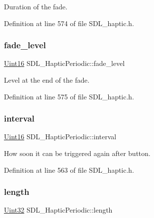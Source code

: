 Duration of the fade. 

Definition at line 574 of file S\+D\+L\+\_\+haptic.\+h.

\mbox{\label{struct_s_d_l___haptic_periodic_afa7713fc264959873f2a852fca4174fd}} 
\subsubsection{\texorpdfstring{fade\_level}{fade\_level}}
{\footnotesize\ttfamily \mbox{\hyperlink{_s_d_l__stdinc_8h_a31fcc0a076c9068668173ee26d33e42b}{Uint16}} S\+D\+L\+\_\+\+Haptic\+Periodic\+::fade\+\_\+level}

Level at the end of the fade. 

Definition at line 575 of file S\+D\+L\+\_\+haptic.\+h.

\mbox{\label{struct_s_d_l___haptic_periodic_a076d266e917098d89b2385b631629162}} 
\subsubsection{\texorpdfstring{interval}{interval}}
{\footnotesize\ttfamily \mbox{\hyperlink{_s_d_l__stdinc_8h_a31fcc0a076c9068668173ee26d33e42b}{Uint16}} S\+D\+L\+\_\+\+Haptic\+Periodic\+::interval}

How soon it can be triggered again after button. 

Definition at line 563 of file S\+D\+L\+\_\+haptic.\+h.

\mbox{\label{struct_s_d_l___haptic_periodic_a0ef0b17c54aaa5c99886c2a618444026}} 
\subsubsection{\texorpdfstring{length}{length}}
{\footnotesize\ttfamily \mbox{\hyperlink{_s_d_l__stdinc_8h_add440eff171ea5f55cb00c4a9ab8672d}{Uint32}} S\+D\+L\+\_\+\+Haptic\+Periodic\+::length}

